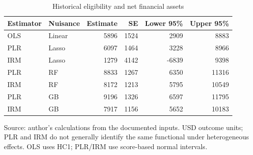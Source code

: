 \begin{table}[htbp]
\centering
\small
\caption{Historical eligibility and net financial assets}
\begin{tabularx}{\linewidth}{Xlrrrr}
\toprule
Estimator & Nuisance & Estimate & SE & Lower 95\% & Upper 95\% \\
\midrule
OLS & Linear & 5896 & 1524 & 2909 & 8883 \\
PLR & Lasso & 6097 & 1464 & 3228 & 8966 \\
IRM & Lasso & 1279 & 4142 & -6839 & 9398 \\
PLR & RF & 8833 & 1267 & 6350 & 11316 \\
IRM & RF & 8172 & 1213 & 5795 & 10549 \\
PLR & GB & 9196 & 1326 & 6597 & 11795 \\
IRM & GB & 7917 & 1156 & 5652 & 10183 \\
\bottomrule
\end{tabularx}
\par\vspace{3pt}\begin{minipage}{\linewidth}\footnotesize Source: author's calculations from the documented inputs.\allowbreak{} USD outcome units; PLR and IRM do not generally identify the same functional under heterogeneous effects.\allowbreak{} OLS uses HC1; PLR/IRM use score-based normal intervals.\allowbreak{}\end{minipage}
\end{table}
